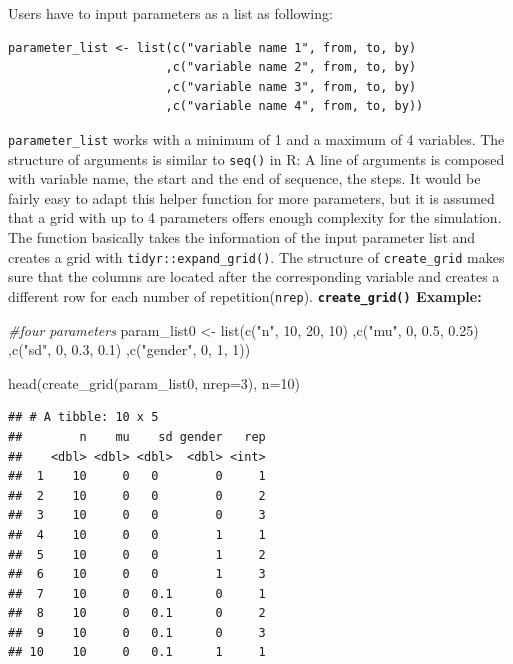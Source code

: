 \documentclass[11pt,a4paper]{article}
\newenvironment{Shaded}{\begin{snugshade}}{\end{snugshade}}
\newcommand{\AttributeTok}[1]{\textcolor[rgb]{0.77,0.63,0.00}{#1}}
\newcommand{\CommentTok}[1]{\textcolor[rgb]{0.56,0.35,0.01}{\textit{#1}}}
\newcommand{\DecValTok}[1]{\textcolor[rgb]{0.00,0.00,0.81}{#1}}
\newcommand{\FloatTok}[1]{\textcolor[rgb]{0.00,0.00,0.81}{#1}}
\newcommand{\FunctionTok}[1]{\textcolor[rgb]{0.00,0.00,0.00}{#1}}
\newcommand{\NormalTok}[1]{#1}
\newcommand{\OtherTok}[1]{\textcolor[rgb]{0.56,0.35,0.01}{#1}}
\newcommand{\StringTok}[1]{\textcolor[rgb]{0.31,0.60,0.02}{#1}}
\begin{document}
Users have to input parameters as a list as following:

\begin{verbatim}
parameter_list <- list(c("variable name 1", from, to, by) 
                      ,c("variable name 2", from, to, by)
                      ,c("variable name 3", from, to, by)
                      ,c("variable name 4", from, to, by))
\end{verbatim}

\texttt{parameter\_list} works with a minimum of 1 and a maximum of 4
variables. The structure of arguments is similar to \texttt{seq()} in R:
A line of arguments is composed with variable name, the start and the
end of sequence, the steps. It would be fairly easy to adapt this helper
function for more parameters, but it is assumed that a grid with up to 4
parameters offers enough complexity for the simulation. The function
basically takes the information of the input parameter list and creates
a grid with \texttt{tidyr::expand\_grid()}. The structure of
\texttt{create\_grid} makes sure that the columns are located after the
corresponding variable and creates a different row for each number of
repetition(\texttt{nrep}). \textbf{\texttt{create\_grid()} Example:}

\begin{Shaded}
\begin{Highlighting}[]
\CommentTok{\#four parameters }
\NormalTok{param\_list0 }\OtherTok{\textless{}{-}} \FunctionTok{list}\NormalTok{(}\FunctionTok{c}\NormalTok{(}\StringTok{"n"}\NormalTok{, }\DecValTok{10}\NormalTok{, }\DecValTok{20}\NormalTok{, }\DecValTok{10}\NormalTok{)}
\NormalTok{                    ,}\FunctionTok{c}\NormalTok{(}\StringTok{"mu"}\NormalTok{, }\DecValTok{0}\NormalTok{, }\FloatTok{0.5}\NormalTok{, }\FloatTok{0.25}\NormalTok{)}
\NormalTok{                    ,}\FunctionTok{c}\NormalTok{(}\StringTok{"sd"}\NormalTok{, }\DecValTok{0}\NormalTok{, }\FloatTok{0.3}\NormalTok{, }\FloatTok{0.1}\NormalTok{)}
\NormalTok{                    ,}\FunctionTok{c}\NormalTok{(}\StringTok{"gender"}\NormalTok{, }\DecValTok{0}\NormalTok{, }\DecValTok{1}\NormalTok{, }\DecValTok{1}\NormalTok{))}

\FunctionTok{head}\NormalTok{(}\FunctionTok{create\_grid}\NormalTok{(param\_list0, }\AttributeTok{nrep=}\DecValTok{3}\NormalTok{), }\AttributeTok{n=}\DecValTok{10}\NormalTok{)}
\end{Highlighting}
\end{Shaded}

\begin{verbatim}
## # A tibble: 10 x 5
##        n    mu    sd gender   rep
##    <dbl> <dbl> <dbl>  <dbl> <int>
##  1    10     0   0        0     1
##  2    10     0   0        0     2
##  3    10     0   0        0     3
##  4    10     0   0        1     1
##  5    10     0   0        1     2
##  6    10     0   0        1     3
##  7    10     0   0.1      0     1
##  8    10     0   0.1      0     2
##  9    10     0   0.1      0     3
## 10    10     0   0.1      1     1
\end{verbatim}
\end{document}
